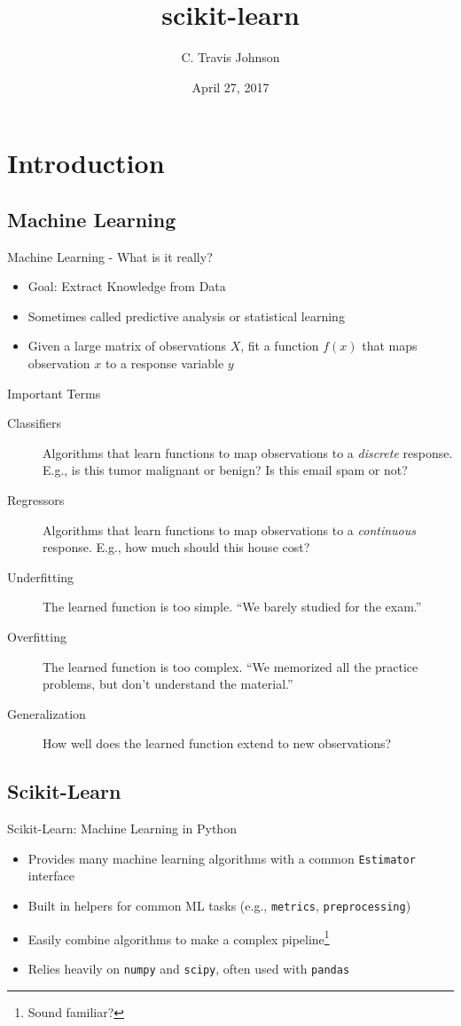 \documentclass{lug}
\title{scikit-learn}
\author{C. Travis Johnson}
\date{April 27, 2017}
\institute{Mines Linux Users Group}
\begin{document}
\section{Introduction}
\subsection{Machine Learning}
\begin{frame}{Machine Learning - What is it really?}
    \begin{itemize}[<+->]
        \item Goal: Extract Knowledge from Data
        \item Sometimes called predictive analysis or statistical learning
        \item Given a large matrix of observations $X$, fit a function $f(x)$ that maps observation $x$ to a response variable $y$
    \end{itemize}
\end{frame}

\begin{frame}{Important Terms}
  \begin{description}
    \item[Classifiers] Algorithms that learn functions to map observations to a \textit{discrete} response. E.g., is this tumor malignant or benign? Is this
      email spam or not?
    \item[Regressors] Algorithms that learn functions to map observations to a \textit{continuous} response. E.g., how much should this house cost?
    \item[Underfitting] The learned function is too simple. ``We barely studied for the exam.''
    \item[Overfitting] The learned function is too complex. ``We memorized all the practice problems, but don't understand the material.''
    \item[Generalization] How well does the learned function extend to new observations?
  \end{description}
\end{frame}

\subsection{Scikit-Learn}
\begin{frame}{Scikit-Learn: Machine Learning in Python}
  \begin{itemize}[<+->]
    \item Provides many machine learning algorithms with a common \texttt{Estimator} interface
    \item Built in helpers for common ML tasks (e.g., \texttt{metrics}, \texttt{preprocessing})
    \item Easily combine algorithms to make a complex pipeline\footnote{Sound familiar?}
    \item Relies heavily on \texttt{numpy} and \texttt{scipy}, often used with \texttt{pandas}
  \end{itemize}
\end{frame}
\end{document}

